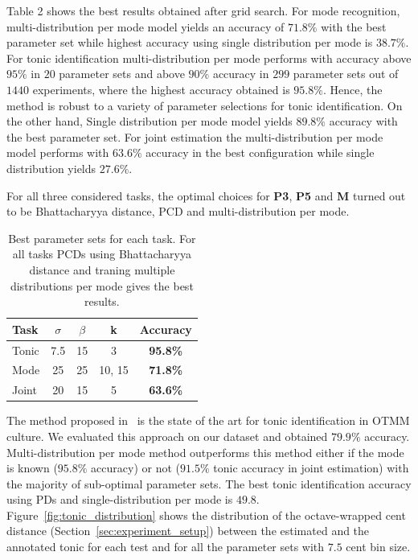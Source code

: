\documentclass{sig-alternate}
\begin{document}
Table 2 shows the best results obtained after grid search. For mode recognition, multi-distribution per mode model yields an accuracy of $71.8\%$ with the best parameter set while highest accuracy using single distribution per mode is $38.7\%$. For tonic identification multi-distribution per mode performs with accuracy above $95\%$ in $20$ parameter sets and above $90\%$ accuracy in $299$ parameter sets out of $1440$ experiments, where the highest accuracy obtained is $95.8\%$. Hence, the method is robust to a variety of parameter selections for tonic identification. On the other hand, Single distribution per mode model yields $89.8\%$ accuracy with the best parameter set. For joint estimation the multi-distribution per mode model performs with $63.6\%$ accuracy in the best configuration while single distribution yields $27.6\%$.

For all three considered tasks, the optimal choices for \textbf{P3}, \textbf{P5} and \textbf{M} turned out to be Bhattacharyya distance, PCD and multi-distribution per mode.
{\renewcommand{\arraystretch}{1.25}
\begin{table}[H]
\label{tab:best_results}
\caption{Best parameter sets for each task. For all tasks PCDs using Bhattacharyya distance and traning multiple distributions per mode gives the best results.}
 \begin{center}
\begin{tabular}{ l c c c c }
\hline
\textbf{Task} & \textbf{$\sigma$} & \textbf{$\beta$} & \textbf{k} & \textbf{Accuracy}\\ \hline
Tonic & 7.5 & 15 & 3 & \textbf{95.8\%}\\
 \hline
Mode & 25 & 25 & 10, 15 & \textbf{71.8\%} \\ \hline
Joint & 20 & 15 & 5 & \textbf{63.6\%}\\ \hline
\end{tabular}
\end{center}
\end{table}}

The method proposed in~\cite{sercan_tonic} is the state of the art for tonic identification in OTMM culture. We evaluated this approach on our dataset and obtained $79.9\%$ accuracy. Multi-distribution per mode method outperforms this method either if the mode is known ($95.8\%$ accuracy) or not ($91.5\%$ tonic accuracy in joint estimation) with the majority of sub-optimal parameter sets. The best tonic identification accuracy using PDs and single-distribution per mode is $49.8$. Figure~\ref{fig:tonic_distribution} shows the distribution of the octave-wrapped cent distance (Section~\ref{sec:experiment_setup}) between the estimated and the annotated tonic for each test and for all the parameter sets with $7.5$ cent bin size. 
\end{document}
